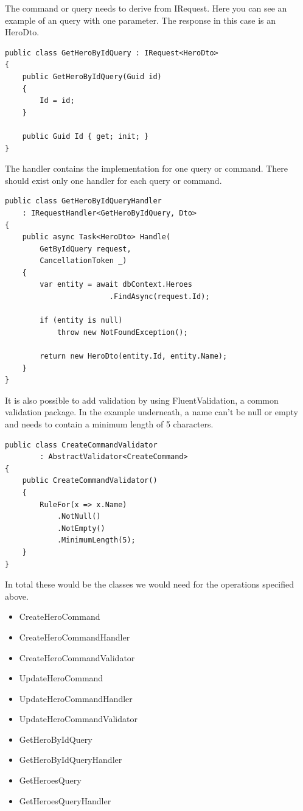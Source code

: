 \documentclass[11pt,conference]{IEEEtran}
\begin{document}
The command or query needs to derive from IRequest.
Here you can see an example of an query with one parameter.
The response in this case is an HeroDto.

\begin{lstlisting}[caption=Query]
public class GetHeroByIdQuery : IRequest<HeroDto>
{
    public GetHeroByIdQuery(Guid id)
    {
        Id = id;
    }

    public Guid Id { get; init; }
}
\end{lstlisting}

The handler contains the implementation for one query or command.
There should exist only one handler for each query or command.

\begin{lstlisting}[caption=Query Handler]
public class GetHeroByIdQueryHandler
    : IRequestHandler<GetHeroByIdQuery, Dto>
{
    public async Task<HeroDto> Handle(
        GetByIdQuery request,
        CancellationToken _)
    {
        var entity = await dbContext.Heroes
                        .FindAsync(request.Id);

        if (entity is null)
            throw new NotFoundException();

        return new HeroDto(entity.Id, entity.Name);
    }
}
\end{lstlisting}

It is also possible to add validation by using FluentValidation, a common validation package.
In the example underneath, a name can't be null or empty and needs to contain a minimum length of 5 characters.

\begin{lstlisting}[caption=Validator]
public class CreateCommandValidator  
        : AbstractValidator<CreateCommand>
{
    public CreateCommandValidator()
    {
        RuleFor(x => x.Name)
            .NotNull()
            .NotEmpty()
            .MinimumLength(5);
    }
}
\end{lstlisting}

In total these would be the classes we would need for the operations specified above.


\begin{itemize}
    \item {CreateHeroCommand}
    \item {CreateHeroCommandHandler}
    \item {CreateHeroCommandValidator}
    \item {UpdateHeroCommand}
    \item {UpdateHeroCommandHandler}
    \item {UpdateHeroCommandValidator}
    \item {GetHeroByIdQuery}
    \item {GetHeroByIdQueryHandler}
    \item {GetHeroesQuery}
    \item {GetHeroesQueryHandler}
\end{itemize}
\end{document}
